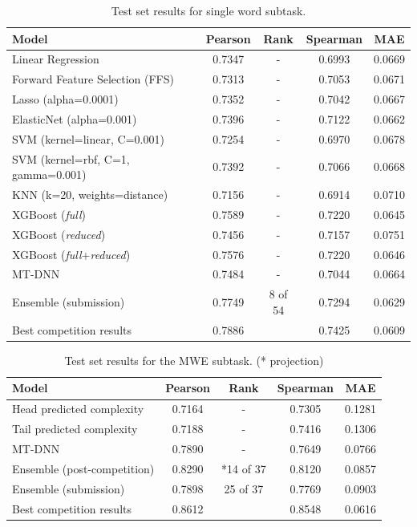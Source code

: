 \documentclass[11pt,a4paper]{article}
\begin{document}
\begin{table}[t]
  \centering
  \begin{tabular}{lcccc}
  \hline \textbf{Model} & \textbf{Pearson} & \textbf{Rank} & \textbf{Spearman} & \textbf{MAE} \\ \hline
  Linear Regression	& 0.7347 & - &	0.6993 &	0.0669 \\
  Forward Feature Selection (FFS)	& 0.7313 & - &	0.7053 & 0.0671 \\
  Lasso (alpha=0.0001) &	0.7352 & - &	0.7042 & 	0.0667 \\
  ElasticNet (alpha=0.001) &	0.7396 & - &	0.7122 &	0.0662 \\
  SVM (kernel=linear, C=0.001) &	0.7254 & - &	0.6970 &	0.0678 \\
  SVM (kernel=rbf, C=1, gamma=0.001) &	0.7392 & - &	0.7066 &	0.0668 \\
  KNN (k=20, weights=distance) &	0.7156 & -	& 0.6914 &	0.0710 \\
  \hline
  XGBoost (\textit{full}) &	0.7589 & - &	0.7220 &	0.0645 \\
  XGBoost (\textit{reduced}) &	0.7456 & - &	0.7157 &	0.0751 \\
  XGBoost (\textit{full}+\textit{reduced}) & 0.7576 & - & 0.7220 & 0.0646 \\
  MT-DNN & 0.7484 & -	& 0.7044 & 0.0664 \\
  Ensemble (submission) & 0.7749 & 8 of 54 & 0.7294 & 0.0629 \\
  \hline
  Best competition results & 0.7886 & & 0.7425 & 0.0609 \\ 
  \hline
  \end{tabular}
  \caption{\label{tab:single-word-results} Test set results for single word subtask. }
\end{table}

\begin{table}[t]
  \centering    
  \centering    
  \begin{tabular}{lcccc}
  \hline \textbf{Model} & \textbf{Pearson} & \textbf{Rank} & \textbf{Spearman} & \textbf{MAE} \\ \hline
  Head predicted complexity & 0.7164 & - & 0.7305 & 0.1281 \\
  Tail predicted complexity & 0.7188 & - & 0.7416 & 0.1306 \\
  MT-DNN & 0.7890 & - & 0.7649 & 0.0766 \\
  Ensemble (post-competition) & 0.8290 & *14 of 37 & 0.8120 & 0.0857 \\
  Ensemble (submission) & 0.7898 & 25 of 37 & 0.7769 & 0.0903 \\
  \hline
  Best competition results & 0.8612 & &  0.8548 & 0.0616 \\ 
  \hline
  \end{tabular}
  \caption{\label{tab:multi-word-results} Test set results for the MWE subtask. (* projection)}
\end{table}
\end{document}
